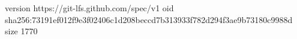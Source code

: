 version https://git-lfs.github.com/spec/v1
oid sha256:73191ef012f9e3f02406c1d208beccd7b313933f782d294f3ae9b73180c9988d
size 1770
